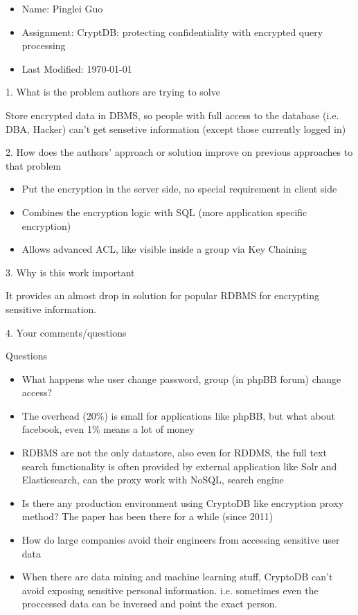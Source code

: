 \documentclass[12pt,a4paper,oneside]{article}
\begin{document}
\begin{itemize}
  \item Name: Pinglei Guo
  \item Assignment: CryptDB: protecting confidentiality with encrypted query processing
  \item Last Modified: \today
\end{itemize}

1. What is the problem authors are trying to solve

\medskip

Store encrypted data in DBMS, so people with full access to the database (i.e. DBA, Hacker)
can't get sensetive information (except those currently logged in)

\bigskip

2. How does the authors’ approach or solution improve on previous approaches to that problem

\medskip

\begin{itemize}
  \item Put the encryption in the server side, no special requirement in client side
  \item Combines the encryption logic with SQL (more application specific encryption)
  \item Allows advanced ACL, like visible inside a group via Key Chaining
\end{itemize}

\bigskip

3. Why is this work important

\medskip

It provides an almost drop in solution for popular RDBMS for encrypting sensitive
information.

\bigskip

4. Your comments/questions

\medskip

Questions

\begin{itemize}
  \item What happens whe user change password, group (in phpBB forum) change access?
  \item The overhead (20\%) is small for applications like phpBB, but what about facebook, even 1\% means a lot of money
  \item RDBMS are not the only datastore, also even for RDDMS, the full text search functionality is often provided by external application
  like Solr and Elasticsearch, can the proxy work with NoSQL, search engine
  \item Is there any production environment using CryptoDB like encryption proxy method? The paper has been there for a while (since 2011)
  \item How do large companies avoid their engineers from accessing sensitive user data
  \item When there are data mining and machine learning stuff, CryptoDB can't avoid exposing sensitive personal information.
  i.e. sometimes even the proccessed data can be inversed and point the exact person.
\end{itemize}
\end{document}
